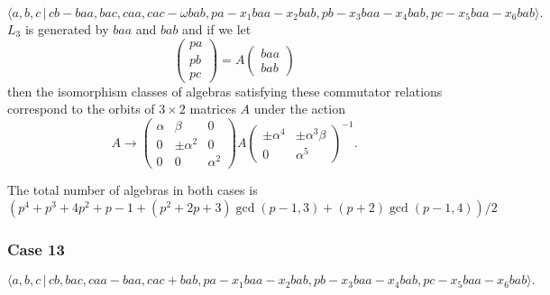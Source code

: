 \documentclass[10pt]{article}
\begin{document}
\begin{equation}
\langle a,b,c\,|\,cb-baa,bac,caa,cac-\omega
bab,pa-x_{1}baa-x_{2}bab,pb-x_{3}baa-x_{4}bab,pc-x_{5}baa-x_{6}bab\rangle . 
\tag{7.768}
\end{equation}%
$L_{3}$ is generated by $baa$ and $bab$ and if we let 
\[
\left( 
\begin{array}{l}
pa \\ 
pb \\ 
pc%
\end{array}%
\right) =A\left( 
\begin{array}{l}
baa \\ 
bab%
\end{array}%
\right) 
\]%
then the isomorphism classes of algebras satisfying these commutator
relations correspond to the orbits of $3\times 2$ matrices $A$ under the
action 
\[
A\rightarrow \left( 
\begin{array}{lll}
\alpha & \beta & 0 \\ 
0 & \pm \alpha ^{2} & 0 \\ 
0 & 0 & \alpha ^{2}%
\end{array}%
\right) A\left( 
\begin{array}{ll}
\pm \alpha ^{4} & \pm \alpha ^{3}\beta \\ 
0 & \alpha ^{5}%
\end{array}%
\right) ^{-1}. 
\]%
$\allowbreak \allowbreak $

The total number of algebras in both cases is 
\[
\allowbreak (p^{4}+p^{3}+4p^{2}+p-1+\allowbreak (p^{2}+2p+3)\gcd
(p-1,3)+(p+2)\gcd (p-1,4))/2 
\]

\subsubsection{Case 13}

\begin{equation}
\langle
a,b,c\,|%
\,cb,bac,caa-baa,cac+bab,pa-x_{1}baa-x_{2}bab,pb-x_{3}baa-x_{4}bab,pc-x_{5}baa-x_{6}bab\rangle .
\tag{7.769}
\end{equation}
\end{document}
